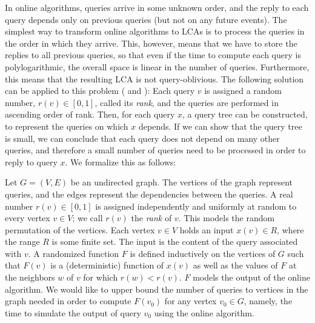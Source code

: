 \documentclass[english, oribibl]{llncs}
\begin{document}
In online algorithms, queries arrive in some unknown order, and the reply to each query depends only on previous queries (but not on any future events). The simplest way to transform online algorithms to LCAs is to process the queries in the order in which they arrive. This, however, means that we have to store the replies to all previous queries, so that even if the time to compute each query is polylogarithmic, the overall space is linear in the number of queries. Furthermore, this means that the resulting LCA is not query-oblivious. The following solution can be applied to this problem (\cite{NO08} and \cite{ARV+11}): Each query $v$ is assigned a random number,  $r(v) \in [0,1]$, called its \emph{rank}, and the queries are performed in ascending order of rank. Then, for each query $x$, a query tree can be constructed, to represent the queries on which $x$ depends. If we can show that the query tree is small, we can conclude that each query does not depend on many other queries, and therefore a small number of queries need to be processed in order to reply to query $x$.  We formalize this as follows: 


Let $G=(V,E)$ be an undirected graph. The vertices of the graph represent queries, and the edges represent the dependencies between the queries.
A real number $r(v) \in [0,1]$ is assigned independently and uniformly at random to every vertex
$v \in V$; we call $r(v)$ the \emph{rank} of $v$. This models the random permutation of the vertices.
Each vertex $v \in V$  holds an input $x(v) \in R$, where the range $R$ is some finite set. The input is the content of the query associated with $v$.
A randomized function $F$ is defined inductively on the vertices of $G$ such that
$F(v)$ is a (deterministic) function of $x(v)$ as well as the values of $F$ at the neighbors $w$ of $v$
for which $r(w) < r(v)$. $F$ models the output of the online algorithm.
We would like to upper bound the number of queries to vertices in the graph needed in order to compute $F(v_0)$ for any vertex $v_0 \in G$, namely, the time to simulate the output of query $v_0$ using the online algorithm.
\end{document}
